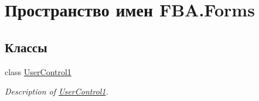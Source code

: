 \hypertarget{namespace_f_b_a_1_1_forms}{}\section{Пространство имен F\+B\+A.\+Forms}
\label{namespace_f_b_a_1_1_forms}
\subsection*{Классы}
\begin{DoxyCompactItemize}
\item 
class \mbox{\hyperlink{class_f_b_a_1_1_forms_1_1_user_control1}{User\+Control1}}
\begin{DoxyCompactList}\small\item\em Description of \mbox{\hyperlink{class_f_b_a_1_1_forms_1_1_user_control1}{User\+Control1}}. \end{DoxyCompactList}\end{DoxyCompactItemize}
